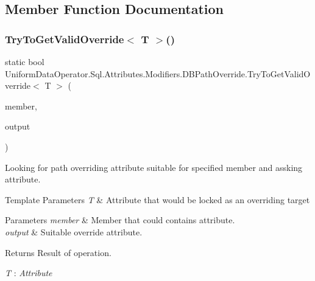 \subsection{Member Function Documentation}
\mbox{\label{class_uniform_data_operator_1_1_sql_1_1_attributes_1_1_modifiers_1_1_d_b_path_override_aa7601220e39d8a68e911e4215bf94cb5}} 
\subsubsection{\texorpdfstring{Try\+To\+Get\+Valid\+Override$<$ T $>$()}{TryToGetValidOverride< T >()}}
{\footnotesize\ttfamily static bool Uniform\+Data\+Operator.\+Sql.\+Attributes.\+Modifiers.\+D\+B\+Path\+Override.\+Try\+To\+Get\+Valid\+Override$<$ T $>$ (\begin{DoxyParamCaption}\item[{Member\+Info}]{member,  }\item[{out \mbox{\hyperlink{class_uniform_data_operator_1_1_sql_1_1_attributes_1_1_modifiers_1_1_d_b_path_override}{D\+B\+Path\+Override}}}]{output }\end{DoxyParamCaption})\hspace{0.3cm}{\ttfamily [static]}}



Looking for path overriding attribute suitable for specified member and assking attribute. 


\begin{DoxyTemplParams}{Template Parameters}
{\em T} & Attribute that would be locked as an overriding target\\
\hline
\end{DoxyTemplParams}

\begin{DoxyParams}{Parameters}
{\em member} & Member that could contains attribute.\\
\hline
{\em output} & Suitable override attribute.\\
\hline
\end{DoxyParams}
\begin{DoxyReturn}{Returns}
Result of operation.
\end{DoxyReturn}
\begin{Desc}
\item[Type Constraints]\begin{description}
\item[{\em T} : {\em Attribute}]\end{description}
\end{Desc}



